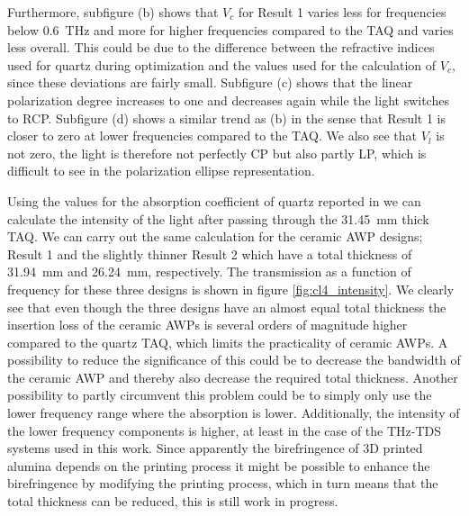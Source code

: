 Furthermore, subfigure (b) shows that $V_c$ for Result 1 varies less for frequencies below \SI{0.6}{\tera \hertz} and more for higher frequencies compared to the TAQ and varies less overall. This could be due to the difference between the refractive indices used for quartz during optimization and the values used for the calculation of $V_c$, since these deviations are fairly small. Subfigure (c) shows that the linear polarization degree increases to one and decreases again while the light switches to RCP. Subfigure (d) shows a similar trend as (b) in the sense that Result 1 is closer to zero at lower frequencies compared to the TAQ. We also see that $V_l$ is not zero, the light is therefore not perfectly CP but also partly LP, which is difficult to see in the polarization ellipse representation. 

Using the values for the absorption coefficient of quartz reported in \cite{DGrischkowsky1990} we can calculate the intensity of the light after passing through the \SI{31.45}{\milli \meter} thick TAQ. We can carry out the same calculation for the ceramic AWP designs; Result 1 and the slightly thinner Result 2 which have a total thickness of \SI{31.94}{\milli \meter} and \SI{26.24}{\milli \meter}, respectively. The transmission as a function of frequency for these three designs is shown in figure \ref{fig:cl4_intensity}. We clearly see that even though the three designs have an almost equal total thickness the insertion loss of the ceramic AWPs is several orders of magnitude higher compared to the quartz TAQ, which limits the practicality of ceramic AWPs.
A possibility to reduce the significance of this could be to decrease the bandwidth of the ceramic AWP and thereby also decrease the required total thickness. Another possibility to partly circumvent this problem could be to simply only use the lower frequency range where the absorption is lower. Additionally, the intensity of the lower frequency components is higher, at least in the case of the THz-TDS systems used in this work. Since apparently the birefringence of 3D printed alumina depends on the printing process it might be possible to enhance the birefringence by modifying the printing process, which in turn means that the total thickness can be reduced, this is still work in progress.

